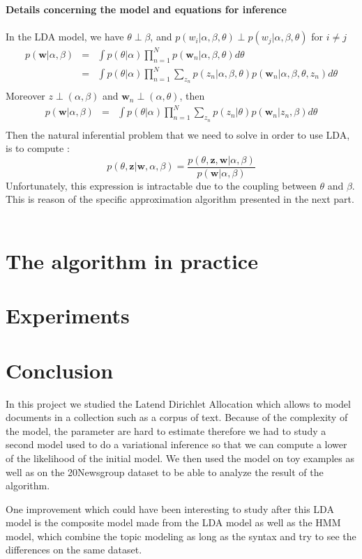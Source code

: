\documentclass[12pt]{article}
\begin{document}
\textbf{Details concerning the model and equations for inference}~\\
~\\
In the LDA model, we have $ \theta \perp \beta$, and $p(w_{i} | \alpha, \beta, \theta) \perp p(w_{j} | \alpha, \beta, \theta)$  for $ i \neq j $
\begin{eqnarray*}
p(\textbf{w}|\alpha, \beta) & = & \int p(\theta | \alpha) \prod_{n=1}^{N} p(\textbf{w}_{n} | \alpha, \beta, \theta)d\theta\\
& = & \int  p(\theta |\alpha) \prod_{n=1}^{N}  \sum_{z_{n}}p(z_{n}|\alpha, \beta, \theta)p(\textbf{w}_{n} | \alpha, \beta, \theta, z_{n}) d\theta\\
\end{eqnarray*}
Moreover $z \perp (\alpha,\beta)$ and $\textbf{w}_{n} \perp (\alpha,\theta)$, then
\begin{eqnarray*}
p(\textbf{w}|\alpha, \beta) & = & \int p(\theta | \alpha)  \prod_{n=1}^{N}  \sum_{z_{n}}p(z_{n} |\theta)p(\textbf{w}_{n} | z_{n}, \beta) d\theta\\
\end{eqnarray*}
Then the natural inferential problem that we need to solve in order to use LDA, is to compute :
$$p(\theta, \textbf{z}|\textbf{w},\alpha,\beta)=\frac{p(\theta,\textbf{z},\textbf{w}|\alpha,\beta)}{p(\textbf{w}|\alpha,\beta)}$$
Unfortunately, this expression is intractable due to the coupling between $\theta$ and $\beta$.
This is reason of the specific approximation algorithm presented in the next part. ~\\

\section{The algorithm in practice}

\section{Experiments}

\section*{Conclusion}

In this project we studied the Latend Dirichlet Allocation which allows to model documents in a collection such as a corpus of text. Because of the complexity of the model, the parameter are hard to estimate therefore we had to study a second model used to do a variational inference so that we can compute a lower of the likelihood of the initial model. We then used the model on toy examples as well as on the 20Newsgroup dataset to be able to analyze the result of the algorithm.

One improvement which could have been interesting to study after this LDA model is the composite model made from the LDA model as well as the HMM model, which combine the topic modeling as long as the syntax and try to see the differences on the same dataset. 
\end{document}
